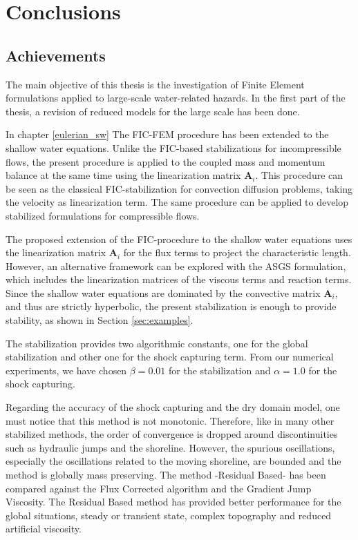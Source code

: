
\chapter{Conclusions}
\label{conclusions}




\section{Achievements}




The main objective of this thesis is the investigation of Finite Element formulations applied to large-scale water-related hazards. In the first part of the thesis, a revision of reduced models for the large scale has been done.

In chapter \ref{eulerian_sw} The FIC-FEM procedure has been extended to the shallow water equations. Unlike the FIC-based stabilizations for incompressible flows, the present procedure is applied to the coupled mass and momentum balance at the same time using the linearization matrix $\mathbf{A}_i$. This procedure can be seen as the classical FIC-stabilization for convection diffusion problems, taking the velocity as linearization term. The same procedure can be applied to develop stabilized formulations for compressible flows.

The proposed extension of the FIC-procedure to the shallow water equations uses the linearization matrix $\mathbf{A}_i$ for the flux terms to project the characteristic length. However, an alternative framework can be explored with the ASGS \cite{hughes1995,codina2008} formulation, which includes the linearization matrices of the viscous terms and reaction terms. Since the shallow water equations are dominated by the convective matrix $\mathbf{A}_i$, and thus are strictly hyperbolic, the present stabilization is enough to provide stability, as shown in Section \ref{sec:examples}.

The stabilization provides two algorithmic constants, one for the global stabilization and other one for the shock capturing term. From our numerical experiments, we have chosen $\beta=0.01$ for the stabilization and $\alpha=1.0$ for the shock capturing.

Regarding the accuracy of the shock capturing and the dry domain model, one must notice that this method is not monotonic. Therefore, like in many other stabilized methods, the order of convergence is dropped around discontinuities such as hydraulic jumps and the shoreline. However, the spurious oscillations, especially the oscillations related to the moving shoreline, are bounded and the method is globally mass preserving. The method -Residual Based- has been compared against the Flux Corrected algorithm and the Gradient Jump Viscosity. The Residual Based method has provided better performance for the global situations, steady or transient state, complex topography and reduced artificial viscosity.

